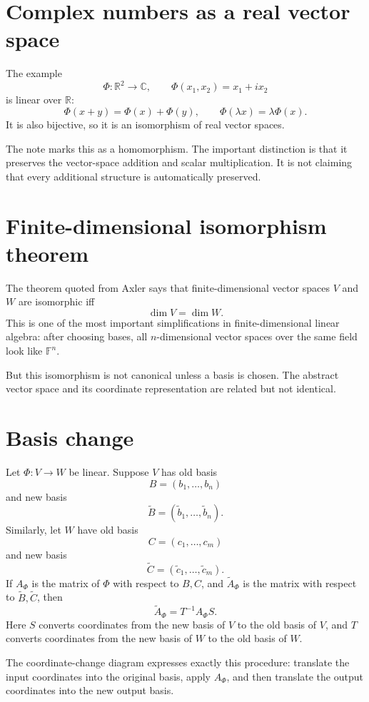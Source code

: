 \section{Complex numbers as a real vector space}

The example
\[
  \Phi:\mathbb R^2\to\mathbb C,\qquad
  \Phi(x_1,x_2)=x_1+ix_2
\]
is linear over $\mathbb R$:
\[
  \Phi(x+y)=\Phi(x)+\Phi(y),\qquad
  \Phi(\lambda x)=\lambda \Phi(x).
\]
It is also bijective, so it is an isomorphism of real vector spaces.

The note marks this as a homomorphism.  The important distinction is that it preserves the vector-space addition and scalar multiplication.  It is not claiming that every additional structure is automatically preserved.

\section{Finite-dimensional isomorphism theorem}

The theorem quoted from Axler says that finite-dimensional vector spaces $V$ and $W$ are isomorphic iff
\[
  \dim V=\dim W.
\]
This is one of the most important simplifications in finite-dimensional linear algebra: after choosing bases, all $n$-dimensional vector spaces over the same field look like $\mathbb F^n$.

But this isomorphism is not canonical unless a basis is chosen.  The abstract vector space and its coordinate representation are related but not identical.

\section{Basis change}

Let $\Phi:V\to W$ be linear.  Suppose $V$ has old basis
\[
  B=(b_1,\ldots,b_n)
\]
and new basis
\[
  \widetilde B=(\widetilde b_1,\ldots,\widetilde b_n).
\]
Similarly, let $W$ have old basis
\[
  C=(c_1,\ldots,c_m)
\]
and new basis
\[
  \widetilde C=(\widetilde c_1,\ldots,\widetilde c_m).
\]
If $A_\Phi$ is the matrix of $\Phi$ with respect to $B,C$, and $\widetilde A_\Phi$ is the matrix with respect to $\widetilde B,\widetilde C$, then
\[
  \widetilde A_\Phi=T^{-1}A_\Phi S.
\]
Here $S$ converts coordinates from the new basis of $V$ to the old basis of $V$, and $T$ converts coordinates from the new basis of $W$ to the old basis of $W$.

The coordinate-change diagram expresses exactly this procedure: translate the input coordinates into the original basis, apply $A_\Phi$, and then translate the output coordinates into the new output basis.

